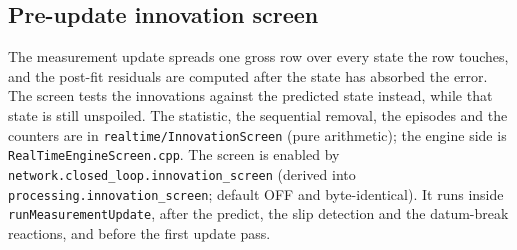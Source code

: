 \documentclass[main.tex]{subfiles}
\begin{document}
\subsection{Pre-update innovation screen}\label{sec:rt-screen}

The measurement update spreads one gross row over every state the row
touches, and the post-fit residuals are computed after the state has
absorbed the error.  The screen tests the innovations against the predicted
state instead, while that state is still unspoiled.  The statistic, the
sequential removal, the episodes and the counters are in
\texttt{realtime/InnovationScreen} (pure arithmetic); the engine side is
\texttt{RealTimeEngineScreen.cpp}.  The screen is enabled by
\texttt{network.closed\_loop.innovation\_screen} (derived into
\texttt{processing.innovation\_screen}; default OFF and byte-identical).  It
runs inside \texttt{runMeasurementUpdate}, after the predict, the slip detection
and the datum-break reactions, and before the first update pass.
\end{document}
